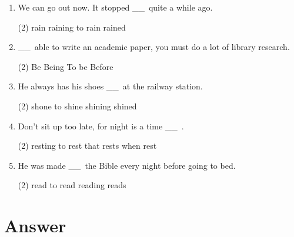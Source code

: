 \documentclass{yufa}
\newcommand\ttu{ \_\_\ }
\begin{document}
\begin{enumerate}
\item We can go out now. It stopped \ttu quite a while ago.
  \begin{tasks}(2)
    \task rain
    \task raining
    \task to rain
    \task rained
  \end{tasks}

\item \ttu able to write an academic paper, you must do a lot of library research.
  \begin{tasks}(2)
    \task Be
    \task Being
    \task To be
    \task Before
  \end{tasks}

\item He always has his shoes \ttu at the railway station.
  \begin{tasks}(2)
    \task shone
    \task to shine
    \task shining
    \task shined
  \end{tasks}

\item Don't sit up too late, for night is a time \ttu.
  \begin{tasks}(2)
    \task resting
    \task to rest
    \task that rests
    \task when rest
  \end{tasks}

\item He was made \ttu the Bible every night before going to bed.
  \begin{tasks}(2)
    \task read
    \task to read
    \task reading
    \task reads
  \end{tasks}

\end{enumerate}

\section{Answer}
\end{document}
